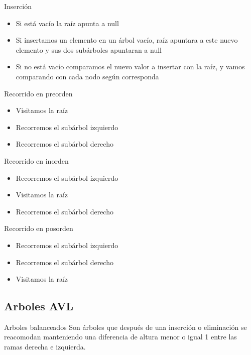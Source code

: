 \documentclass{beamer}
\begin{document}
\begin{frame}{Inserci\'on}
	\begin{itemize}
		\item Si est\'a vac\'io la ra\'iz apunta a null
		\item Si insertamos un elemento en un \'arbol vac\'io, ra\'iz apuntara a este nuevo elemento y sus dos sub\'arboles apuntaran a null
		\item  Si no est\'a vac\'io comparamos el nuevo valor a insertar con la ra\'iz, y vamos comparando con cada nodo seg\'un corresponda
	\end{itemize}
\end{frame}

\begin{frame}{Recorrido en preorden}
	\begin{itemize}
		\item Visitamos la ra\'iz
		\item Recorremos el sub\'arbol izquierdo
		\item Recorremos el sub\'arbol derecho
	\end{itemize}
\end{frame}

\begin{frame}{Recorrido en inorden}
	\begin{itemize}
		\item Recorremos el sub\'arbol izquierdo
		\item Visitamos la ra\'iz
		\item Recorremos el sub\'arbol derecho
	\end{itemize}
\end{frame}

\begin{frame}{Recorrido en posorden}
	\begin{itemize}
		\item Recorremos el sub\'arbol izquierdo
		\item Recorremos el sub\'arbol derecho
		\item Visitamos la ra\'iz
	\end{itemize}
\end{frame}


\subsection{Arboles AVL}

\begin{frame}{Arboles balanceados}
	Son \'arboles que despu\'es de una inserci\'on o eliminaci\'on se reacomodan manteniendo una diferencia de altura menor o igual 1 entre las ramas derecha e izquierda.
\end{frame}
\end{document}

